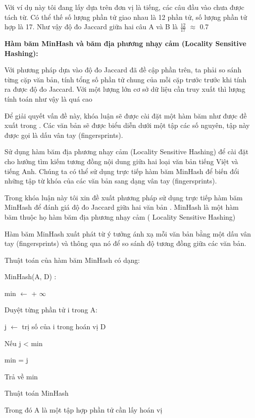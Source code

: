 \documentclass[12pt]{report}
\begin{document}
Với ví dụ này tôi đang lấy dựa trên đơn vị là tiếng, các câu đầu vào chưa được tách từ. Có thể thế số lượng phần tử giao nhau là 12 phần tử, số lượng phần tử hợp là 17. Như vậy độ đo Jaccard giữa hai câu A và B là $\frac{12}{17}$ $\approx$ 0.7


\noindent \textbf{Hàm băm MinHash và băm địa phương nhạy cảm (Locality Sensitive Hashing):}

Với phương pháp dựa vào độ đo Jaccard đã đề cập phần trên, ta phải 
so sánh từng cặp văn bản, tính tổng số phần tử chung của mỗi cặp trước trước khi tính ra được độ đo Jaccard. Với một lượng lớn cơ sở dữ liệu cần truy xuất thì lượng tính toán như vậy là quá cao

Để giải quyết vấn đề này, khóa luận sẽ được cài đặt một hàm băm như được đề xuất trong \cite{cia-cross}. Các văn bản sẽ được biểu diễn dưới một tập các số nguyên, tập này được gọi là dấu vân tay (fingersprints).


Sử dụng hàm băm địa phương nhạy cảm (Locality Sensitive Hashing) để cài đặt cho hướng tìm kiếm tương đồng nội dung giữa hai loại văn bản tiếng Việt và tiếng Anh. Chúng ta có thể sử dụng trực tiếp hàm băm MinHash để biến đổi những tập từ khóa của các văn bản sang dạng vân tay (fingersprints).

Trong khóa luận này tôi xin đề xuất phương pháp sử dụng trực tiếp hàm băm MinHash để đánh giá độ đo Jaccard giữa hai văn bản \cite{cia-mining}. MinHash là một hàm băm thuộc họ hàm băm địa phương nhạy cảm ( Locality Sensitive Hashing) \cite{cia-lsh}


Hàm băm MinHash xuất phát từ ý tưởng ánh xạ mỗi văn bản bằng một dấu vân tay (fingersprints) và thông qua nó để so sánh độ tương đồng giữa các văn bản.


Thuật toán của hàm băm MinHash có dạng:

\begin{algorithm}[H]
	\SetAlgoLined
	MinHash(A, D) :

	min $\gets$ + $\infty$
	
	Duyệt từng phần tử i trong A:
		
	\hspace{10mm}j $\gets$ trị số của i trong hoán vị D
		
	\hspace{10mm}Nếu j < min
	
	\hspace{20mm}min = j
	
	Trả về min
	\caption{Thuật toán MinHash}
\end{algorithm}
Trong đó A là một tập hợp phần tử cần lấy hoán vị
\end{document}
